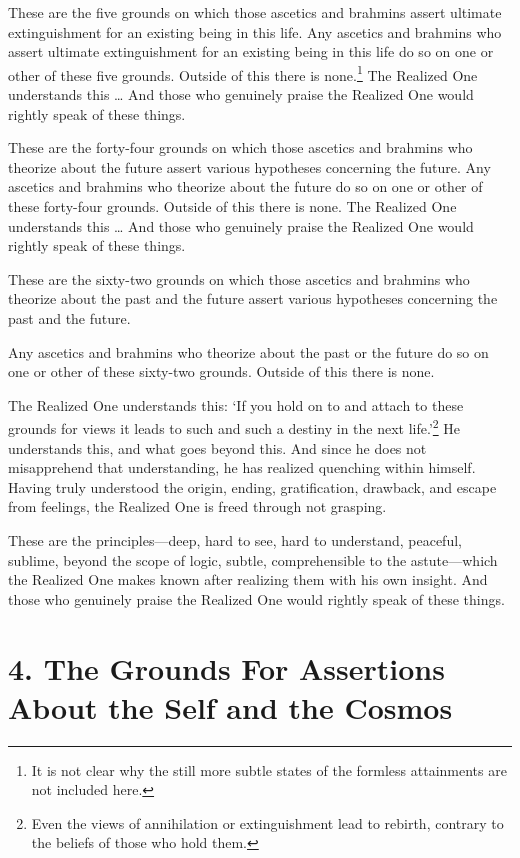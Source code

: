 \documentclass[12pt,openany]{book}%
\begin{document}
These are the five grounds on which those ascetics and brahmins assert ultimate extinguishment for an existing being in this life. Any ascetics and brahmins who assert ultimate extinguishment for an existing being in this life do so on one or other of these five grounds. Outside of this there is none.\footnote{It is not clear why the still more subtle states of the formless attainments are not included here. } The Realized One understands this … And those who genuinely praise the Realized One would rightly speak of these things. 

These are the forty-four grounds on which those ascetics and brahmins who theorize about the future assert various hypotheses concerning the future. Any ascetics and brahmins who theorize about the future do so on one or other of these forty-four grounds. Outside of this there is none. The Realized One understands this … And those who genuinely praise the Realized One would rightly speak of these things. 

These are the sixty-two grounds on which those ascetics and brahmins who theorize about the past and the future assert various hypotheses concerning the past and the future. 

Any ascetics and brahmins who theorize about the past or the future do so on one or other of these sixty-two grounds. Outside of this there is none. 

The Realized One understands this: ‘If you hold on to and attach to these grounds for views it leads to such and such a destiny in the next life.’\footnote{Even the views of annihilation or extinguishment lead to rebirth, contrary to the beliefs of those who hold them. } He understands this, and what goes beyond this. And since he does not misapprehend that understanding, he has realized quenching within himself. Having truly understood the origin, ending, gratification, drawback, and escape from feelings, the Realized One is freed through not grasping. 

These are the principles—deep, hard to see, hard to understand, peaceful, sublime, beyond the scope of logic, subtle, comprehensible to the astute—which the Realized One makes known after realizing them with his own insight. And those who genuinely praise the Realized One would rightly speak of these things. 

\section*{4. The Grounds For Assertions About the Self and the Cosmos }
\end{document}
